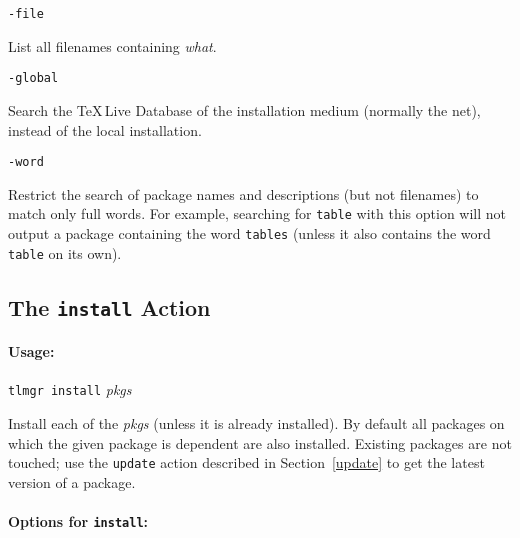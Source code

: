 \documentclass[11pt]{article}
\begin{document}
\begin{description}

\item\texttt{-file}\par 

List all filenames containing \textsl{what}.

\item\texttt{-global}\par 

Search the \TeX\,Live Database of the installation medium (normally the net),
instead of the local installation.

\item\texttt{-word}\par 

Restrict the search of package names and descriptions (but
not filenames) to match only full words. For example,
searching for \texttt{table} with this option will not
output a package containing the word \texttt{tables} (unless
it also contains the word \texttt{table} on its own).

\end{description}

\clearpage

\subsection{The {\tt install} Action}
\label{install}

\paragraph{Usage:}
\begin{list}{}{}
\item  \texttt{tlmgr install} \textsl{pkgs}
\end{list}

Install each of the \textsl{pkgs} (unless it is already
installed). By default all packages on which the given
package is dependent are also installed. Existing packages
are not touched; use the \texttt{update} action described in
Section~\ref{update} to get the latest version of a package.


\paragraph{Options for \mdseries\texttt{install}:}
\end{document}

